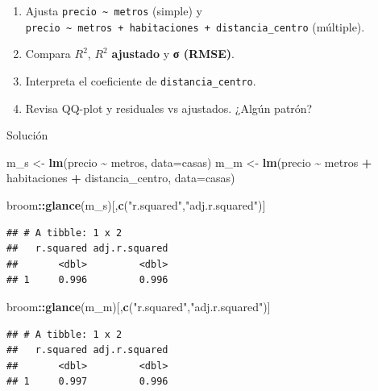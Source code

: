 \documentclass[
]{book}
\newenvironment{Shaded}{\begin{snugshade}}{\end{snugshade}}
\newcommand{\AttributeTok}[1]{\textcolor[rgb]{0.13,0.29,0.53}{#1}}
\newcommand{\FunctionTok}[1]{\textcolor[rgb]{0.13,0.29,0.53}{\textbf{#1}}}
\newcommand{\NormalTok}[1]{#1}
\newcommand{\OtherTok}[1]{\textcolor[rgb]{0.56,0.35,0.01}{#1}}
\newcommand{\SpecialCharTok}[1]{\textcolor[rgb]{0.81,0.36,0.00}{\textbf{#1}}}
\newcommand{\StringTok}[1]{\textcolor[rgb]{0.31,0.60,0.02}{#1}}
\providecommand{\tightlist}{%
  \setlength{\itemsep}{0pt}\setlength{\parskip}{0pt}}
\begin{document}
\begin{enumerate}
\def\labelenumi{\arabic{enumi})}
\tightlist
\item
  Ajusta \texttt{precio\ \textasciitilde{}\ metros} (simple) y \texttt{precio\ \textasciitilde{}\ metros\ +\ habitaciones\ +\ distancia\_centro} (múltiple).\\
\item
  Compara \(R^2\), \(R^2\) \textbf{ajustado} y \textbf{σ (RMSE)}.\\
\item
  Interpreta el coeficiente de \texttt{distancia\_centro}.\\
\item
  Revisa QQ-plot y residuales vs ajustados. ¿Algún patrón?
\end{enumerate}

Solución

\begin{Shaded}
\begin{Highlighting}[]
\NormalTok{m\_s }\OtherTok{\textless{}{-}} \FunctionTok{lm}\NormalTok{(precio }\SpecialCharTok{\textasciitilde{}}\NormalTok{ metros, }\AttributeTok{data=}\NormalTok{casas)}
\NormalTok{m\_m }\OtherTok{\textless{}{-}} \FunctionTok{lm}\NormalTok{(precio }\SpecialCharTok{\textasciitilde{}}\NormalTok{ metros }\SpecialCharTok{+}\NormalTok{ habitaciones }\SpecialCharTok{+}\NormalTok{ distancia\_centro, }\AttributeTok{data=}\NormalTok{casas)}

\NormalTok{broom}\SpecialCharTok{::}\FunctionTok{glance}\NormalTok{(m\_s)[,}\FunctionTok{c}\NormalTok{(}\StringTok{"r.squared"}\NormalTok{,}\StringTok{"adj.r.squared"}\NormalTok{)]}
\end{Highlighting}
\end{Shaded}

\begin{verbatim}
## # A tibble: 1 x 2
##   r.squared adj.r.squared
##       <dbl>         <dbl>
## 1     0.996         0.996
\end{verbatim}

\begin{Shaded}
\begin{Highlighting}[]
\NormalTok{broom}\SpecialCharTok{::}\FunctionTok{glance}\NormalTok{(m\_m)[,}\FunctionTok{c}\NormalTok{(}\StringTok{"r.squared"}\NormalTok{,}\StringTok{"adj.r.squared"}\NormalTok{)]}
\end{Highlighting}
\end{Shaded}

\begin{verbatim}
## # A tibble: 1 x 2
##   r.squared adj.r.squared
##       <dbl>         <dbl>
## 1     0.997         0.996
\end{verbatim}
\end{document}

